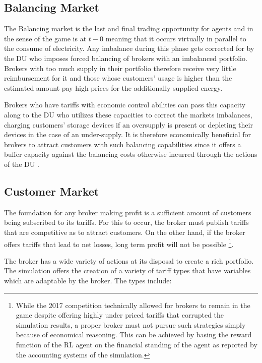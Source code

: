 \subsection{Balancing Market}
The Balancing market is the last and final trading opportunity for agents and in the sense of the game is at $t-0$ meaning that it occurs virtually in parallel to the consume of electricity. Any imbalance during this phase gets corrected for by the \ac{DU} who imposes forced balancing of brokers with an imbalanced portfolio. Brokers with too much supply in their portfolio therefore receive very little reimbursement for it and those whose customers' usage is higher than the estimated amount pay high prices for the additionally supplied energy. 

Brokers who have tariffs with economic control abilities can pass this capacity along to the \ac{DU} who utilizes these capacities to correct the markets imbalances, charging customers' storage devices if an oversupply is present or depleting their devices in the case of an under-supply. It is therefore economically beneficial for brokers to attract customers with such balancing capabilities since it offers a buffer capacity against the balancing costs otherwise incurred through the actions of the \ac{DU} \citep[p.5]{ketter2018powertac} .  





\subsection{Customer Market}

The foundation for any broker making profit is a sufficient amount of customers being subscribed to its tariffs. For this to occur, the broker must publish tariffs that are competitive as to attract customers. On the other hand, if the broker offers tariffs that lead to net losses, long term profit will not be possible
\footnote{While the 2017 competition technically allowed for brokers to remain in the game despite offering highly under priced tariffs that corrupted the simulation results, a proper broker must not pursue such strategies simply because of economical reasoning. %
This can be achieved by basing the reward function of the \ac{RL} agent on the financial standing of the agent as reported by the accounting systems of the simulation.}.

The broker has a wide variety of actions at its disposal to create a rich portfolio. The simulation offers the creation of a variety of tariff types that have variables which are adaptable by the broker. The types include:
	

